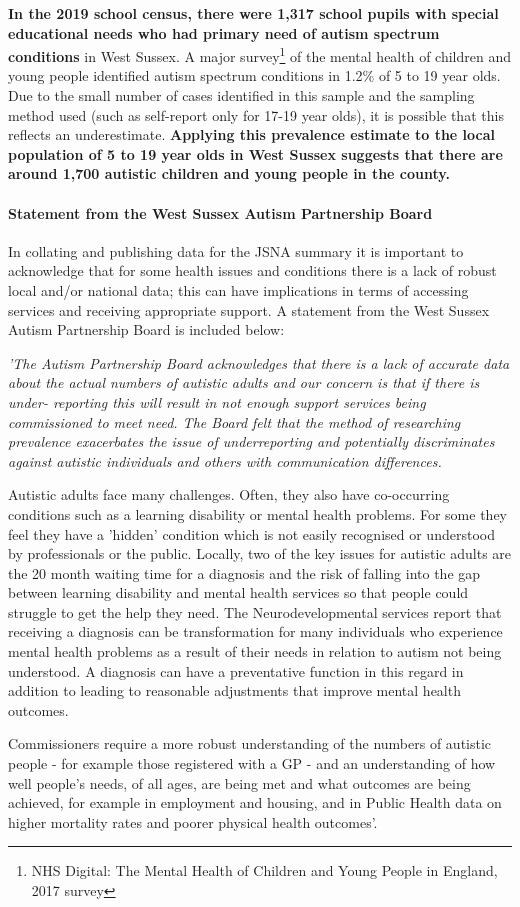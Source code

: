 {\bfseries In the 2019 school census, there were 1,317 school pupils with special educational needs who had primary need of autism spectrum conditions} in West Sussex. A major survey\footnote{NHS Digital: The Mental Health of Children and Young People in England, 2017 survey} of the mental health of children and young people identified autism spectrum conditions in 1.2\% of 5 to 19 year olds. Due to the small number of cases identified in this sample and the sampling method used (such as self-report only for 17-19 year olds), it is possible that this reflects an underestimate. {\bfseries Applying this prevalence estimate to the local population of 5 to 19 year olds in West Sussex suggests that there are around 1,700 autistic children and young people in the county.}

\paragraph{Statement from the West Sussex Autism Partnership Board} In collating and publishing data for the JSNA summary it is important to acknowledge that for some health issues and conditions there is a lack of robust local and/or national data; this can have implications in terms of accessing services and receiving appropriate support. A statement from the West Sussex Autism Partnership Board is included below:

{\itshape 'The Autism Partnership Board acknowledges that there is a lack of accurate data about the actual numbers of autistic adults and our concern is that if there is under- reporting this will result in not enough support services being commissioned to meet need. The Board felt that the method of researching prevalence exacerbates the issue of underreporting and potentially discriminates against autistic individuals and others with communication differences.

Autistic adults face many challenges. Often, they also have co-occurring conditions such as a learning disability or mental health problems. For some they feel they have a 'hidden' condition which is not easily recognised or understood by professionals or the public. Locally, two of the key issues for autistic adults are the 20 month waiting time for a diagnosis and the risk of falling into the gap between learning disability and mental health services so that people could struggle to get the help they need. The Neurodevelopmental services report that receiving a diagnosis can be transformation for many individuals who experience mental health problems as a result of their needs in relation to autism not being understood. A diagnosis can have a preventative function in this regard in addition to leading to reasonable adjustments that improve mental health outcomes.

Commissioners require a more robust understanding of the numbers of autistic people - for example those registered with a GP - and an understanding of how well people's needs, of all ages, are being met and what outcomes are being achieved, for example in employment and housing, and in Public Health data on higher mortality rates and poorer physical health outcomes'.}


